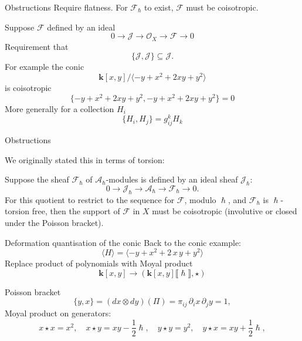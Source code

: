 \begin{frame}{Obstructions}
    Require flatness. For \( \mathcal{F}_\hslash \) to exist, \( \mathcal{F}\) must be coisotropic.
    
    Suppose \( \mathcal{F}\) defined by an ideal 
    \[ 0 \rightarrow \mathcal{J} \rightarrow \mathcal{O}_X \rightarrow \mathcal{F} \rightarrow 0 \]
    Requirement that \[ \{ \mathcal{J}, \mathcal{J} \} \subseteq  \mathcal{J}. \]
    For example the conic 
    \[ \mathbf{k}[x,y] / \langle -y + x^2 + 2 x y + y^2 \rangle \]
    is coisotropic
    \[ \{ -y + x^2 + 2 x y + y^2, -y + x^2 + 2 x y + y^2 \} = 0\]
    More generally for a collection \(H_i\)
    \[ \{ H_i, H_j \} = g_{ij}^k H_k\]
\end{frame}

\begin{frame}{Obstructions}

    We originally stated this in terms of torsion: 
    
    \begin{thm} \label{thm:torsionfree}   
    Suppose the sheaf \( \mathcal{F}_{\hslash}\) of \(\mathcal{A}_{\hslash} \)-modules is defined by an ideal sheaf \( \mathcal{J}_{\hslash} \):
    \[ 0 \rightarrow \mathcal{J}_{\hslash} \rightarrow \mathcal{A}_\hslash \rightarrow \mathcal{F}_{\hslash} \rightarrow 0. \]
    For this quotient to restrict to the sequence for \( \mathcal{F}\), modulo \( \hslash\), and \( \mathcal{F}_{\hslash}\) is \(\hslash\)-torsion free, then the support of \( \mathcal{F}\) in \(X\) must be coisotropic (involutive or closed under the Poisson bracket).
    \end{thm}

\end{frame}


\begin{frame}{Deformation quantisation of the conic}
    Back to the conic example: 
    \[ \langle H \rangle = \langle -y + x^2 + 2 \,x \,y + y^2 \rangle \] 
    Replace product of polynomials with Moyal product
    \[ \mathbf{k}[x,y] \rightarrow ( \mathbf{k}[x,y] \lBrack \hslash \rBrack, \star ) \]
    
    Poisson bracket \[ \{y,x\}=  (dx\otimes dy) ( \Pi) = \pi_{ij} \,\partial_i x \, \partial_j y = 1, \] 
    Moyal product on generators:
    \[ x \star x = x^2 , \quad  x \star y = x y - \frac{1}{2} \hslash , \quad y \star y = y^2, \quad y \star x = x y + \frac{1}{2}\hslash, \]

\end{frame}

